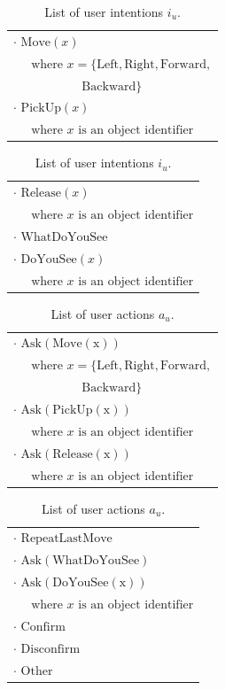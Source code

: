 \begin{table}[p]
\begin{footnotesize}
\begin{tabular}{p{60mm}} 
$\cdot$ $\mathrm{Move}(x) $ \\ $ \ \ \ \ \ \text{ where } x=\{\mathrm{Left,Right,Forward,}$ \\ $\ \ \ \ \ \ \ \ \ \ \ \ \ \ \ \ \ \ \ \ \ \ \ \ \ \mathrm{Backward}\} $ \\ 
$\cdot$ $\mathrm{PickUp}(x) $ \\ $\ \ \ \ \  \text{ where } x \text{ is an object identifier}$ 
\end{tabular}
\hspace{2cm}
\begin{tabular}{p{60mm}} 
$\cdot$ $\mathrm{Release}(x) $ \\ $\ \ \ \ \  \text{ where } x \text{ is an object identifier}$ \\
$\cdot$ $\mathrm{WhatDoYouSee}$ \\
$\cdot$ $\mathrm{DoYouSee}(x) $ \\ $\ \ \ \ \  \text{ where } x \text{ is an object identifier}$ 
\end{tabular}
\end{footnotesize}
 \caption{List of user intentions $i_u$.} 
\label{table:userintents_exp2}
\end{table}


\begin{table}[p]
\begin{footnotesize}
\begin{tabular}{p{60mm}} 
$\cdot$ $\mathrm{Ask(Move(x))} $ \\ $ \ \ \ \ \ \text{ where } x=\{\mathrm{Left,Right,Forward,}$ \\ $\ \ \ \ \ \ \ \ \ \ \ \ \ \ \ \ \ \ \ \ \ \ \ \ \ \mathrm{Backward}\} $ \\ 
$\cdot$ $\mathrm{Ask(PickUp(x))} $ \\ $\ \ \ \ \  \text{ where } x \text{ is an object identifier}$ \\
$\cdot$ $\mathrm{Ask(Release(x))} $ \\ $\ \ \ \ \  \text{ where } x \text{ is an object identifier}$ 
\end{tabular}
\hspace{2cm}
\begin{tabular}{p{60mm}} 
$\cdot$ $\mathrm{RepeatLastMove}$ \\
$\cdot$ $\mathrm{Ask(WhatDoYouSee)}$ \\
$\cdot$ $\mathrm{Ask(DoYouSee(x))} $ \\ $\ \ \ \ \  \text{ where } x \text{ is an object identifier}$ \\
$\cdot$ $\mathrm{Confirm}$ \\
$\cdot$ $\mathrm{Disconfirm}$ \\
$\cdot$ $\mathrm{Other}$ 
\end{tabular}
\end{footnotesize}
 \caption{List of user actions $a_u$.} 
\label{table:userdas_exp2}
\end{table}

